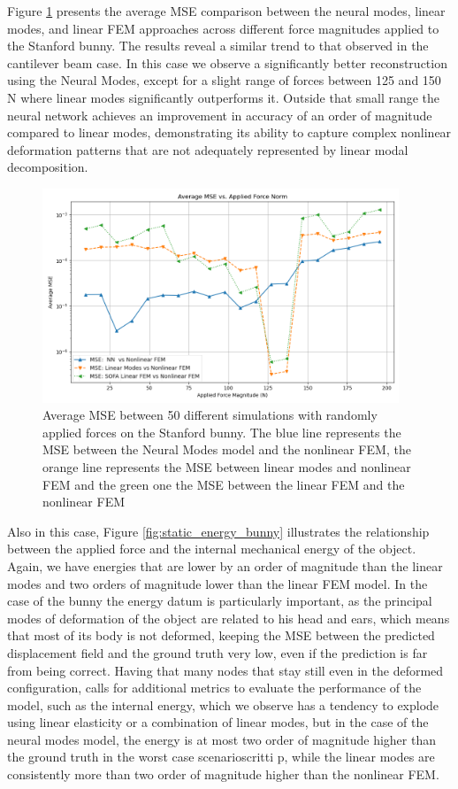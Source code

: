 Figure \ref{fig:static_mse_bunny} presents the average MSE comparison between the neural modes, linear modes, and linear FEM approaches across different force magnitudes applied to the Stanford bunny. The results reveal a similar trend to that observed in the cantilever beam case. In this case we observe a significantly better reconstruction using the Neural Modes, except for a slight range of forces between 125 and 150 N where linear modes significantly outperforms it. Outside that small range the neural network achieves an improvement in accuracy of an order of magnitude compared to linear modes, demonstrating its ability to capture complex nonlinear deformation patterns that are not adequately represented by linear modal decomposition. 
\begin{figure}[H]
    \centering
    \includegraphics[width=0.95\textwidth]{Images/bunny_static_mse.png}
    \caption{Average MSE between 50 different simulations with randomly applied forces on the Stanford bunny. The blue line represents the MSE between the Neural Modes model and the nonlinear FEM, the orange line represents the MSE between linear modes and nonlinear FEM and the green one the MSE between the linear FEM and the nonlinear FEM}
    \label{fig:static_mse_bunny}
    \end{figure}

Also in this case, Figure \ref{fig:static_energy_bunny} illustrates the relationship between the applied force and the internal mechanical energy of the object. Again, we have energies that are lower by an order of magnitude than the linear modes and two orders of magnitude lower than the linear FEM model. In the case of the bunny the energy datum is particularly important, as the principal modes of deformation of the object are related to his head and ears, which means that most of its body is not deformed, keeping the MSE between the predicted displacement field and the ground truth very low, even if the prediction is far from being correct. Having that many nodes that stay still even in the deformed configuration, calls for additional metrics to evaluate the performance of the model, such as the internal energy, which we observe has a tendency to explode using linear elasticity or a combination of linear modes, but in the case of the neural modes model, the energy is at most two order of magnitude higher than the ground truth in the worst case scenarioscritti p, while the linear modes are consistently more than two order of magnitude higher than the nonlinear FEM.

